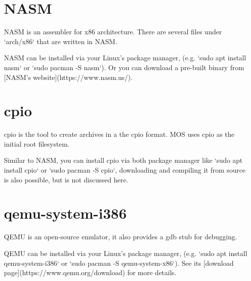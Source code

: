 

\section{NASM}

NASM is an assembler for x86 architecture. There are several files under `arch/x86`
that are written in NASM.

NASM can be installed via your Linux's package manager, (e.g. `sudo apt install nasm`
or `sudo pacman -S nasm`). Or you can download a pre-built binary from [NASM's website](https://www.nasm.us/).

\section{cpio}

cpio is the tool to create archives in a the cpio format. MOS uses cpio as the initial
root filesystem.

Similar to NASM, you can install cpio via both package manager like `sudo apt install cpio`
or `sudo pacman -S cpio`, downloading and compiling it from source is also possible, but is not discussed here.

\section{qemu-system-i386}

QEMU is an open-source emulator, it also provides a gdb stub for debugging.

QEMU can be installed via your Linux's package manager, (e.g. `sudo apt install qemu-system-i386`
or `sudo pacman -S qemu-system-x86`). See its [download page](https://www.qemu.org/download) for more details.
